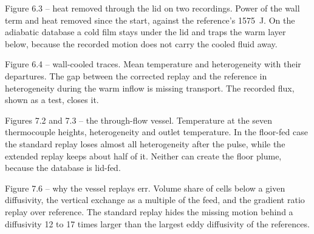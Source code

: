 \begin{qabox}{Figure 6.3 -- heat removed through the lid on two recordings.}
\explain Power of the wall term and heat removed since the start, against the reference's 1575~J. On
the adiabatic database a cold film stays under the lid and traps the warm layer below, because the
recorded motion does not carry the cooled fluid away.
\end{qabox}

\begin{qabox}{Figure 6.4 -- wall-cooled traces.}
\explain Mean temperature and heterogeneity with their departures. The gap between the corrected
replay and the reference in heterogeneity during the warm inflow is missing transport. The recorded
flux, shown as a test, closes it.
\end{qabox}

\begin{qabox}{Figures 7.2 and 7.3 -- the through-flow vessel.}
\explain Temperature at the seven thermocouple heights, heterogeneity and outlet temperature. In
the floor-fed case the standard replay loses almost all heterogeneity after the pulse, while the
extended replay keeps about half of it. Neither can create the floor plume, because the database is
lid-fed.
\end{qabox}

\begin{qabox}{Figure 7.6 -- why the vessel replays err.}
\explain Volume share of cells below a given diffusivity, the vertical exchange as a multiple of the
feed, and the gradient ratio replay over reference. The standard replay hides the missing motion
behind a diffusivity 12 to 17 times larger than the largest eddy diffusivity of the references.
\end{qabox}

